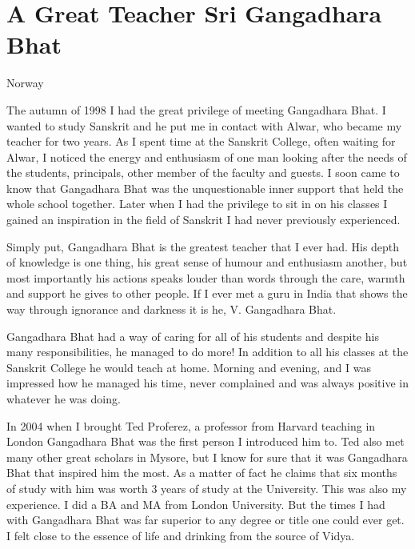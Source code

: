 \chapter{A Great Teacher Sri Gangadhara Bhat}

\begin{center}
\smallskip

Norway
\end{center}

The autumn of 1998 I had the great privilege of meeting Gangadhara Bhat. I wanted to study Sanskrit and he put me in contact with Alwar, who became my teacher for two years. As I spent time at the Sanskrit College, often waiting for Alwar, I noticed the energy and enthusiasm of one man looking after the needs of the students, principals, other member of the faculty and guests. I soon came to know that Gangadhara Bhat was the unquestionable inner support that held the whole school together. Later when I had the privilege to sit in on his classes I gained an inspiration in the field of Sanskrit I had never previously experienced.

Simply put, Gangadhara Bhat is the greatest teacher that I ever had. His depth of knowledge is one thing, his great sense of humour and enthusiasm another, but most importantly his actions speaks louder than words through the care, warmth and support he gives to other people. If I ever met a guru in India that shows the way through ignorance and darkness it is he, V. Gangadhara Bhat.

Gangadhara Bhat had a way of caring for all of his students and despite his many responsibilities, he managed to do more! In addition to all his classes at the Sanskrit College he would teach at home. Morning and evening, and I was impressed how he managed his time, never complained and was always positive in whatever he was doing.

In 2004 when I brought Ted Proferez, a professor from Harvard teaching in London Gangadhara Bhat was the first person I introduced him to. Ted also met many other great scholars in Mysore, but I know for sure that it was Gangadhara Bhat that inspired him the most. As a matter of fact he claims that six months of study with him was worth 3 years of study at the University. This was also my experience. I did a BA and MA from London University. But the times I had with Gangadhara Bhat was far superior to any degree or title one could ever get. I felt close to the essence of life and drinking from the source of Vidya.

